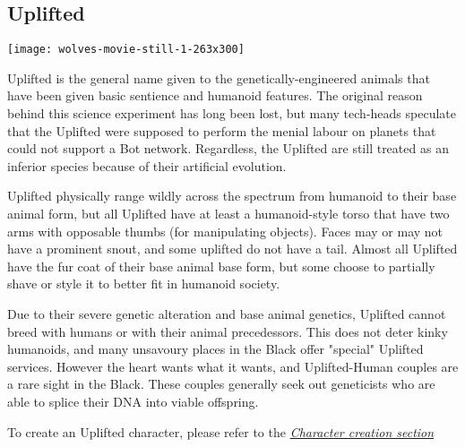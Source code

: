 \subsection{Uplifted}
\label{sec:specie-uplifted}

\texttt{[image: wolves-movie-still-1-263x300]}

Uplifted is the general name given to the genetically-engineered animals that have been given basic sentience and humanoid features. The original reason behind this science experiment has long been lost, but many tech-heads speculate that the Uplifted were supposed to perform the menial labour on planets that could not support a Bot network. Regardless, the Uplifted are still treated as an inferior species because of their artificial evolution.

Uplifted physically range wildly across the spectrum from humanoid to their base animal form, but all Uplifted have at least a humanoid-style torso that have two arms with opposable thumbs (for manipulating objects). Faces may or may not have a prominent snout, and some uplifted do not have a tail. Almost all Uplifted have the fur coat of their base animal base form, but some choose to partially shave or style it to better fit in humanoid society.

Due to their severe genetic alteration and base animal genetics, Uplifted cannot breed with humans or with their animal precedessors. This does not deter kinky humanoids, and many unsavoury places in the Black offer "special" Uplifted services. However the heart wants what it wants, and Uplifted-Human couples are a rare sight in the Black. These couples generally seek out geneticists who are able to splice their DNA into viable offspring.

To create an Uplifted character, please refer to the \textit{\hyperref[sec:rules-creation]{Character creation section}}
